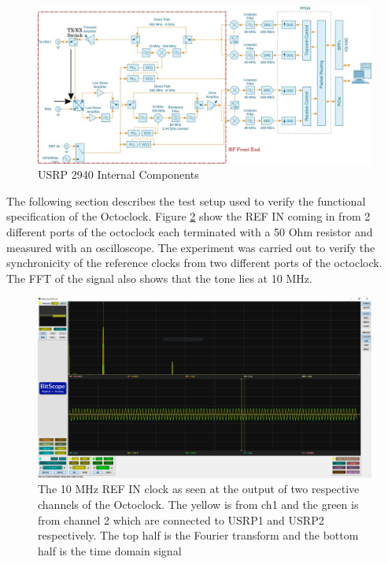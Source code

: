 \begin{landscape}%
    \begin{figure}[H]
        \centering
        \includegraphics[width=\linewidth]{images/USRPInternalsEdited.jpeg}
        \caption{USRP 2940 Internal Components}%
        \label{fig:USRPInternals}%
    \end{figure}
\end{landscape}

The following section describes the test setup used to verify the functional specification of the Octoclock. Figure \ref{fig:RefSigFFT} show the REF IN coming in from 2 different ports of the octoclock each terminated with a 50 Ohm resistor and measured with an oscilloscope. The experiment was carried out to verify the synchronicity of the reference clocks from two different ports of the octoclock. The FFT of the signal also shows that the tone lies at 10 MHz.

\begin{figure}[h]
    \centering
    \includegraphics[width=\linewidth]{images/PPSTrigFFT.png}
    \caption{The 10 MHz REF IN clock as seen at the output of two respective channels of the Octoclock. The yellow is from ch1 and the green is from channel 2 which are connected to USRP1 and USRP2 respectively. The top half is the Fourier transform and the bottom half is the time domain signal}
    \label{fig:RefSigFFT}%
\end{figure}

